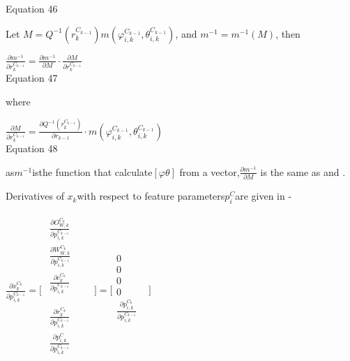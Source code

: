 Equation 46

Let $M=Q^{-1}(r_{k}^{C_{k-1}})m(\varphi _{i, k}^{C_{k-1}}, \theta _{i, 
k}^{C_{k-1}})$, and $m^{-1}=m^{-1}(M)$, then

$\frac{\partial m^{-1}}{\partial r_{k}^{C_{k-1}}}=\frac{\partial 
m^{-1}}{\partial M}\cdot \frac{\partial M}{\partial r_{k}^{C_{k-1}}}$
\\


Equation 47

where

$\frac{\partial M}{\partial r_{k}^{C_{k-1}}}= \frac{\partial 
Q^{-1}(r_{k}^{C_{k-1}})}{\partial r_{k-1}}\cdot m(\varphi _{i, 
k}^{C_{k-1}}, \theta _{i, k}^{C_{k-1}})$\\


Equation 48

as$m^{-1}$isthe function that calculate$[\varphi \theta ]$ from a 
vector,$\frac{\partial m^{-1}}{\partial M}$ is the same as and .

Derivatives of $x_{k}$with respect to feature parameters$p_{i}^{C}
$are given in - 

$\frac{\partial x_{k}^{C_{k}}}{\partial p_{i,k}^{C_{k-1 }}}=\lbrack 
\begin{matrix}
\begin{matrix}
\frac{\partial O_{W,k}^{C_{k}}}{\partial p_{i,k}^{C_{k-1 }}} & \\
\frac{\partial W_{W,k}^{C_{k}}}{\partial p_{i,k}^{C_{k-1 }}} & \\
\frac{\partial c_{k}^{C_{k}}}{\partial p_{i,k}^{C_{k-1 }}} & \\
\end{matrix}
 & \\
\begin{matrix}
\frac{\partial r_{k}^{C_{k}}}{\partial p_{i,k}^{C_{k-1 }}} & \\
\frac{\partial p_{i, k}^{C}}{\partial p_{i,k}^{C_{k-1 }}} & \\
\end{matrix}
 & \\
\end{matrix}
\rbrack =\lbrack \begin{matrix}
0 & \\
0 & \\
0 & \\
0 & \\
\frac{\partial p_{i,k}^{C_{k }}}{\partial p_{i,k}^{C_{k-1 }}} & \\
\end{matrix}
\rbrack $\\


